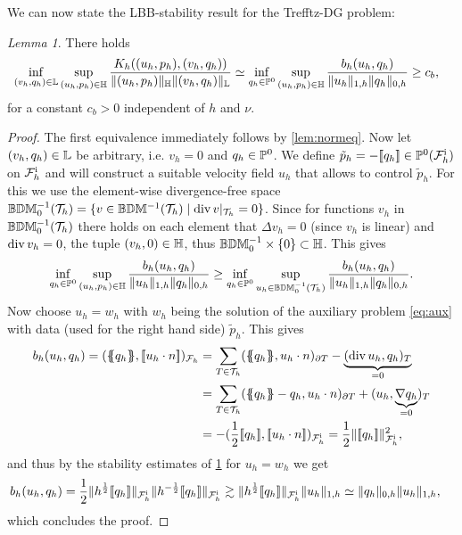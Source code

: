 \documentclass[pdflatex,sn-mathphys,Numbered]{sn-jnl}%
\theoremstyle{remark}%
\newtheorem{lemma}[theorem]{Lemma}
\theoremstyle{definition}%
\begin{document}
We can now state the LBB-stability result for the Trefftz-DG problem:
\begin{lemma}\label{lem:LBB}
  There holds
  \begin{align*}
    &  \inf_{(v_h,q_h) \in \mathbb{L}} \sup_{(u_h,p_h) \in \mathbb{H}} \frac{K_h((u_h,p_h),(v_h,q_h))}{\Vert (u_h,p_h) \Vert_{\mathbb{H}} \Vert (v_h,q_h) \Vert_{\mathbb{L}}}  \simeq
    \inf_{q_h \in \mathbb{P}^0} \sup_{(u_h,p_h) \in \mathbb{H}} \frac{b_h(u_h,q_h)}{\Vert u_h \Vert_{1,h} \Vert q_h \Vert_{0,h}}
    \geq c_b,
  \end{align*}
  for a constant $c_b > 0$ independent of $h$ and $\nu$.
\end{lemma}
\begin{proof}
  The first equivalence immediately follows by \cref{lem:normeq}.
  Now let $(v_h,q_h) \in \mathbb{L}$ be arbitrary, i.e. $v_h = 0$ and $q_h \in \mathbb{P}^0$.
  We define $\tilde{p}_h = -[\![q_h]\!] \in \mathbb{P}^0({\mathcal{F}_h^{\text{i}}})$ on ${\mathcal{F}_h^{\text{i}}}$ and will construct a suitable velocity field $u_h$ that allows to control $\tilde{p}_h$.
  For this we use the element-wise divergence-free space $\mathbb{B}\mathbb{D}\mathbb{M}^{-1}_0({\mathcal{T}_h}) =
  \{v \in \mathbb{B}\mathbb{D}\mathbb{M}^{-1}({\mathcal{T}_h}) \mid \operatorname{\mathrm{div}} v|_{{\mathcal{T}_h}} = 0\}$. Since for functions $v_h$ in $\mathbb{B}\mathbb{D}\mathbb{M}^{-1}_0({\mathcal{T}_h})$ there holds on each element that $\Delta v_h =
  0$ (since $v_h$ is linear) and $\operatorname{\mathrm{div}} v_h = 0 $, the tuple $(v_h,0) \in \mathbb{H}$, thus $\mathbb{B}\mathbb{D}\mathbb{M}^{-1}_0 \times \{0\} \subset \mathbb{H}$. This gives
  $$
  \inf_{q_h \in \mathbb{P}^0} \sup_{(u_h,p_h) \in \mathbb{H}} \frac{b_h(u_h,q_h)}{\Vert u_h \Vert_{1,h} \Vert q_h \Vert_{0,h}}
  \geq \inf_{q_h \in \mathbb{P}^0} \sup_{u_h \in \mathbb{B}\mathbb{D}\mathbb{M}^{-1}_0({\mathcal{T}_h})} \frac{b_h(u_h,q_h)}{\Vert u_h \Vert_{1,h} \Vert q_h \Vert_{0,h}}.
  $$
  Now choose $u_h=w_h$ with $w_h$ being the solution of the auxiliary problem \eqref{eq:aux} with data (used for the right hand side) $\tilde{p}_h$. This gives
  \begin{align*}
    b_h(u_h,q_h)  = (\avg{q_h}, \jmp{u_h \cdot n})_{\Fh}  
    &=
    \sum_{T\in\Th} (\avg{q_h}, u_h \cdot n)_{\partial T} - \underbrace{(\Div u_h, q_h)_T}_{=0} \\
    & =\sum_{T\in\Th} (\avg{q_h}-q_h, u_h \cdot n)_{\partial T} + ( u_h, \underbrace{ \nabla q_h}_{=0})_T  \\
    &= -(\frac12 \jmp{q_h}, \jmp{u_h \cdot n})_{\Fhi} = \frac12 \nrm{\jmp{q_h}}_{\Fhi}^2,
  \end{align*}
  and thus by the stability estimates of \cref{lem:LBB} for $u_h=w_h$ we get
  \begin{align*}
    b_h(u_h,q_h) & = \frac12 \Vert h^{\frac12}[\![q_h]\!] \Vert_{{\mathcal{F}_h^{\text{i}}}} \Vert h^{-\frac12}[\![q_h]\!] \Vert_{{\mathcal{F}_h^{\text{i}}}} \gtrsim \Vert h^{\frac12}[\![q_h]\!] \Vert_{{\mathcal{F}_h^{\text{i}}}} \Vert u_h \Vert_{1,h} \simeq \Vert q_h \Vert_{0,h} \Vert u_h \Vert_{1,h},
  \end{align*}
  which concludes the proof.
\end{proof}
\end{document}
